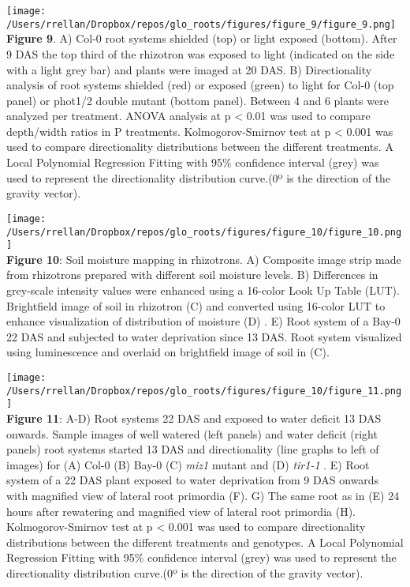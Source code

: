\documentclass[]{article}
\begin{document}
\texttt{[image: /Users/rrellan/Dropbox/repos/glo\_roots/figures/figure\_9/figure\_9.png]}\\\textbf{Figure
9}. A) Col-0 root systems shielded (top) or light exposed (bottom).
After 9 DAS the top third of the rhizotron was exposed to light
(indicated on the side with a light grey bar) and plants were imaged at
20 DAS. B) Directionality analysis of root systems shielded (red) or
exposed (green) to light for Col-0 (top panel) or phot1/2 double mutant
(bottom panel). Between 4 and 6 plants were analyzed per treatment.
ANOVA analysis at p \textless{} 0.01 was used to compare depth/width
ratios in P treatments. Kolmogorov-Smirnov test at p \textless{} 0.001
was used to compare directionality distributions between the different
treatments. A Local Polynomial Regression Fitting with 95\% confidence
interval (grey) was used to represent the directionality distribution
curve.(0º is the direction of the gravity vector).

\texttt{[image: /Users/rrellan/Dropbox/repos/glo\_roots/figures/figure\_10/figure\_10.png]}\\\textbf{Figure
10}: Soil moisture mapping in rhizotrons. A) Composite image strip made
from rhizotrons prepared with different soil moisture levels. B)
Differences in grey-scale intensity values were enhanced using a
16-color Look Up Table (LUT). Brightfield image of soil in rhizotron (C)
and converted using 16-color LUT to enhance visualization of
distribution of moisture (D) . E) Root system of a Bay-0 22 DAS and
subjected to water deprivation since 13 DAS. Root system visualized
using luminescence and overlaid on brightfield image of soil in (C).

\texttt{[image: /Users/rrellan/Dropbox/repos/glo\_roots/figures/figure\_10/figure\_11.png]}\\\textbf{Figure
11}: A-D) Root systems 22 DAS and exposed to water deficit 13 DAS
onwards. Sample images of well watered (left panels) and water deficit
(right panels) root systems started 13 DAS and directionality (line
graphs to left of images) for (A) Col-0 (B) Bay-0 (C) \emph{miz1} mutant
and (D) \emph{tir1-1} . E) Root system of a 22 DAS plant exposed to
water deprivation from 9 DAS onwards with magnified view of lateral root
primordia (F). G) The same root as in (E) 24 hours after rewatering and
magnified view of lateral root primordia (H). Kolmogorov-Smirnov test at
p \textless{} 0.001 was used to compare directionality distributions
between the different treatments and genotypes. A Local Polynomial
Regression Fitting with 95\% confidence interval (grey) was used to
represent the directionality distribution curve.(0º is the direction of
the gravity vector).
\end{document}
